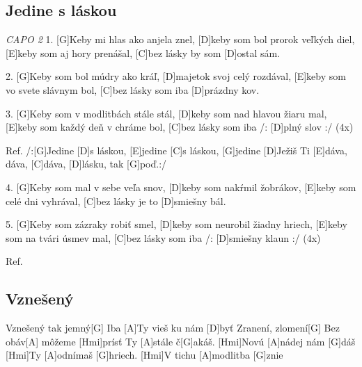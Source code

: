 \documentclass[10pt]{article}
\begin{document}
\begin{Large}
\begin{minipage}{\textwidth}
\subsection{Jedine s láskou}
\begin{guitar}
	\textit{CAPO 2}
	1.
	[G]Keby mi hlas ako anjela znel, [D]keby som bol prorok veľkých diel,
	[E]keby som aj hory prenášal, [C]bez lásky by som [D]ostal sám.
	
	2.
	[G]Keby som bol múdry ako kráľ, [D]majetok svoj celý rozdával,
	[E]keby som vo svete slávnym bol, [C]bez lásky som iba [D]prázdny kov.
	
	3.
	[G]Keby som v modlitbách stále stál, [D]keby som nad hlavou žiaru mal,
	[E]keby som každý deň v chráme bol, [C]bez lásky som iba /: [D]plný slov :/ (4x)
	
	
	Ref.
	/:[G]Jedine [D]s láskou, [E]jedine [C]s láskou,
	[G]jedine [D]Ježiš Ti [E]dáva, dáva, [C]dáva, [D]lásku, tak [G]poď.:/ 
	
	4.
	[G]Keby som mal v sebe veľa snov, [D]keby som nakŕmil žobrákov,
	[E]keby som celé dni vyhrával, [C]bez lásky je to [D]smiešny bál.
	
	5.
	[G]Keby som zázraky robiť smel, [D]keby som neurobil žiadny hriech,
	[E]keby som na tvári úsmev mal, [C]bez lásky som iba  /: [D]smiešny klaun :/ (4x)
	
	Ref.
\end{guitar}
\end{minipage}

\begin{minipage}{\textwidth}
\subsection{Vznešený}
\begin{guitar}	
	[D]Vznešený tak jemný[G]
	Iba [A]Ty vieš ku nám [D]byť
	Zranení, zlomení[G]
	Bez obáv[A] môžeme [Hmi]prísť
	Ty [A]stále č[G]akáš. [Hmi]Novú [A]nádej nám [G]dáš
	[Hmi]Ty [A]odnímaš [G]hriech. [Hmi]V tichu [A]modlitba [G]znie
\end{guitar}
\end{minipage}

\begin{minipage}{\textwidth}

\end{minipage}
\end{Large}
\end{document}
